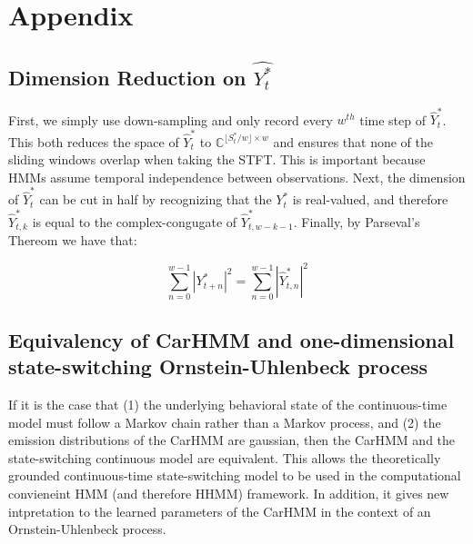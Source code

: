 
\renewcommand*{\thesubsection}{\Alph{subsection}}

\section*{Appendix}

\setcounter{subsection}{0}

\subsection{Dimension Reduction on $\hat{Y_t^*}$}

First, we simply use down-sampling and only record every $w^{th}$ time step of $\hat{Y}_t^*$. This both reduces the space of $\hat{Y}_t^*$ to $\mathbb{C}^{\lfloor S^*_t / w \rfloor \times w}$ and ensures that none of the sliding windows overlap when taking the STFT. This is important because HMMs assume temporal independence between observations. Next, the dimension of $\hat{Y}_t^*$ can be cut in half by recognizing that the $Y_t^*$ is real-valued, and therefore $\hat{Y}_{t,k}^*$ is equal to the complex-congugate of $\hat{Y}_{t,w-k-1}^*$. Finally, by Parseval's Thereom we have that:

$$\sum_{n = 0}^{w-1} |Y^*_{t+n}|^2 = \sum_{n = 0}^{w-1} |\hat{Y}^*_{t,n}|^2$$

\subsection{Equivalency of CarHMM and one-dimensional state-switching Ornstein-Uhlenbeck process}

If it is the case that (1) the underlying behavioral state of the continuous-time model must follow a Markov chain rather than a Markov process, and (2) the emission distributions of the CarHMM are gaussian, then the CarHMM and the state-switching continuous model are equivalent. This allows the theoretically grounded continuous-time state-switching model to be used in the computational convieneint HMM (and therefore HHMM) framework. In addition, it gives new intpretation to the learned parameters of the CarHMM in the context of an Ornstein-Uhlenbeck process.


